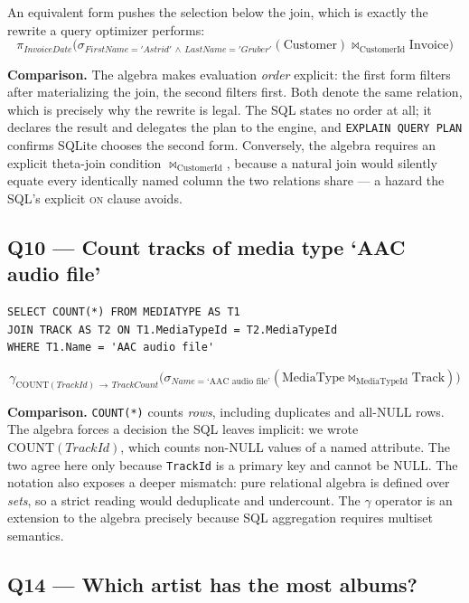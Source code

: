 \documentclass[11pt]{article}
\newcommand{\proj}[1]{\pi_{#1}}
\newcommand{\sel}[1]{\sigma_{#1}}
\newcommand{\agg}[1]{\gamma_{#1}}
\newcommand{\jn}{\bowtie}
\begin{document}
An equivalent form pushes the selection below the join, which is exactly the rewrite a query
optimizer performs:
\[
\proj{InvoiceDate}\bigl(
  \sel{FirstName='Astrid'\,\wedge\,LastName='Gruber'}(\text{Customer})
  \jn_{\text{CustomerId}} \text{Invoice}\bigr)
\]

\textbf{Comparison.} The algebra makes evaluation \emph{order} explicit: the first form filters
after materializing the join, the second filters first. Both denote the same relation, which is
precisely why the rewrite is legal. The SQL states no order at all; it declares the result and
delegates the plan to the engine, and \texttt{EXPLAIN QUERY PLAN} confirms SQLite chooses the
second form. Conversely, the algebra requires an explicit theta-join condition
$\jn_{\text{CustomerId}}$, because a natural join would silently equate every identically named
column the two relations share --- a hazard the SQL's explicit \textsc{on} clause avoids.

\subsection*{Q10 --- Count tracks of media type `AAC audio file'}

\begin{lstlisting}
SELECT COUNT(*) FROM MEDIATYPE AS T1
JOIN TRACK AS T2 ON T1.MediaTypeId = T2.MediaTypeId
WHERE T1.Name = 'AAC audio file'
\end{lstlisting}

\[
\agg{\mathrm{COUNT}(TrackId)\,\rightarrow\,TrackCount}\bigl(
  \sel{Name=\text{`AAC audio file'}}(\text{MediaType} \jn_{\text{MediaTypeId}} \text{Track})\bigr)
\]

\textbf{Comparison.} \texttt{COUNT(*)} counts \emph{rows}, including duplicates and all-NULL
rows. The algebra forces a decision the SQL leaves implicit: we wrote
$\mathrm{COUNT}(TrackId)$, which counts non-NULL values of a named attribute. The two agree
here only because \texttt{TrackId} is a primary key and cannot be NULL. The notation also
exposes a deeper mismatch: pure relational algebra is defined over \emph{sets}, so a strict
reading would deduplicate and undercount. The $\gamma$ operator is an extension to the algebra
precisely because SQL aggregation requires multiset semantics.

\subsection*{Q14 --- Which artist has the most albums?}
\end{document}
